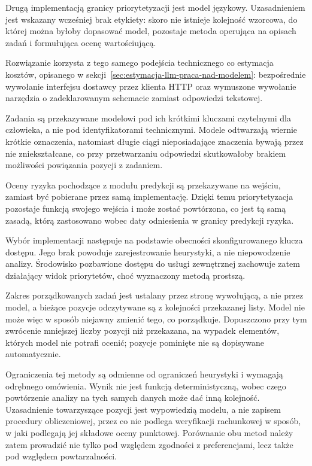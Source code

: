 Drugą implementacją granicy priorytetyzacji jest model językowy. Uzasadnieniem jest wskazany wcześniej brak etykiety: skoro nie istnieje kolejność wzorcowa, do której można byłoby dopasować model, pozostaje metoda operująca na opisach zadań i formułująca ocenę wartościującą.

Rozwiązanie korzysta z tego samego podejścia technicznego co estymacja kosztów, opisanego w sekcji~\ref{sec:estymacja-llm-praca-nad-modelem}: bezpośrednie wywołanie interfejsu dostawcy przez klienta HTTP oraz wymuszone wywołanie narzędzia o zadeklarowanym schemacie zamiast odpowiedzi tekstowej.

Zadania są przekazywane modelowi pod ich krótkimi kluczami czytelnymi dla człowieka, a nie pod identyfikatorami technicznymi. Modele odtwarzają wiernie krótkie oznaczenia, natomiast długie ciągi nieposiadające znaczenia bywają przez nie zniekształcane, co przy przetwarzaniu odpowiedzi skutkowałoby brakiem możliwości powiązania pozycji z zadaniem.

Oceny ryzyka pochodzące z modułu predykcji są przekazywane na wejściu, zamiast być pobierane przez samą implementację. Dzięki temu priorytetyzacja pozostaje funkcją swojego wejścia i może zostać powtórzona, co jest tą samą zasadą, którą zastosowano wobec daty odniesienia w granicy predykcji ryzyka.

Wybór implementacji następuje na podstawie obecności skonfigurowanego klucza dostępu. Jego brak powoduje zarejestrowanie heurystyki, a nie niepowodzenie analizy. Środowisko pozbawione dostępu do usługi zewnętrznej zachowuje zatem działający widok priorytetów, choć wyznaczony metodą prostszą.

Zakres porządkowanych zadań jest ustalany przez stronę wywołującą, a nie przez model, a bieżące pozycje odczytywane są z kolejności przekazanej listy. Model nie może więc w sposób niejawny zmienić tego, co porządkuje. Dopuszczono przy tym zwrócenie mniejszej liczby pozycji niż przekazana, na wypadek elementów, których model nie potrafi ocenić; pozycje pominięte nie są dopisywane automatycznie.

Ograniczenia tej metody są odmienne od ograniczeń heurystyki i wymagają odrębnego omówienia. Wynik nie jest funkcją deterministyczną, wobec czego powtórzenie analizy na tych samych danych może dać inną kolejność. Uzasadnienie towarzyszące pozycji jest wypowiedzią modelu, a nie zapisem procedury obliczeniowej, przez co nie podlega weryfikacji rachunkowej w sposób, w jaki podlegają jej składowe oceny punktowej. Porównanie obu metod należy zatem prowadzić nie tylko pod względem zgodności z preferencjami, lecz także pod względem powtarzalności.

